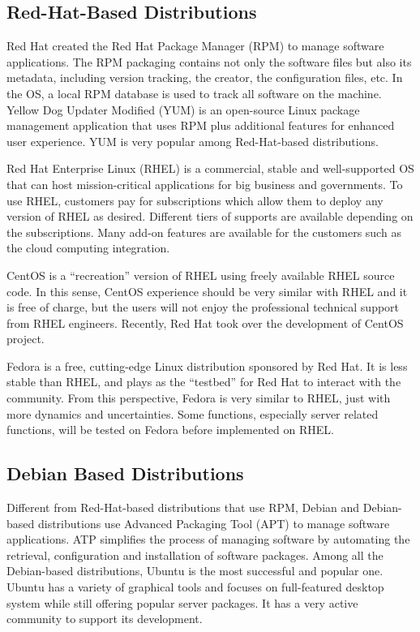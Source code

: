 \subsection{Red-Hat-Based Distributions}

Red Hat created the Red Hat Package Manager (RPM) to manage software applications. The RPM packaging contains not only the software files but also its metadata, including version tracking, the creator, the configuration files, etc. In the OS, a local RPM database is used to track all software on the machine. Yellow Dog Updater Modified (YUM) is an open-source Linux package management application that uses RPM plus additional features for enhanced user experience. YUM is very popular among Red-Hat-based distributions.

Red Hat Enterprise Linux (RHEL) is a commercial, stable and well-supported OS that can host mission-critical applications for big business and governments. To use RHEL, customers pay for subscriptions which allow them to deploy any version of RHEL as desired. Different tiers of supports are available depending on the subscriptions. Many add-on features are available for the customers such as the cloud computing integration.

CentOS is a ``recreation'' version of RHEL using freely available RHEL source code. In this sense, CentOS experience should be very similar with RHEL and it is free of charge, but the users will not enjoy the professional technical support from RHEL engineers. Recently, Red Hat took over the development of CentOS project.

Fedora is a free, cutting-edge Linux distribution sponsored by Red Hat. It is less stable than RHEL, and plays as the ``testbed'' for Red Hat to interact with the community. From this perspective, Fedora is very similar to RHEL, just with more dynamics and uncertainties. Some functions, especially server related functions, will be tested on Fedora before implemented on RHEL.

\subsection{Debian Based Distributions}

Different from Red-Hat-based distributions that use RPM, Debian and Debian-based distributions use Advanced Packaging Tool (APT) to manage software applications. ATP simplifies the process of managing software by automating the retrieval, configuration and installation of software packages. Among all the Debian-based distributions, Ubuntu is the most successful and popular one. Ubuntu has a variety of graphical tools and focuses on full-featured desktop system while still offering popular server packages. It has a very active community to support its development.

